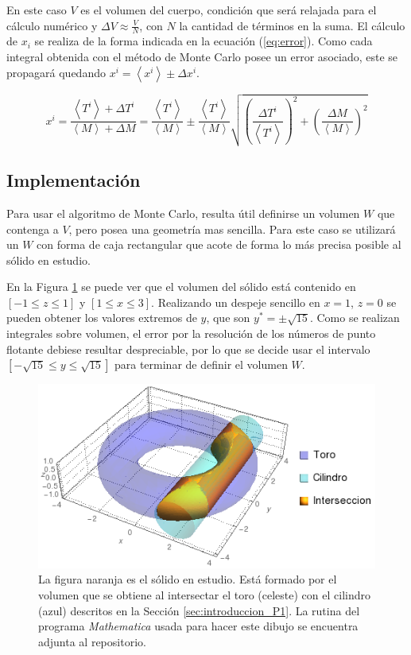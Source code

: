 \documentclass{article}
\def\mean#1{\left< #1 \right>}
\begin{document}
En este caso $V$ es el volumen del cuerpo, condición que será relajada para el cálculo numérico y $\Delta V \approx \frac{V}{N}$, con $N$ la cantidad de términos en la suma. El cálculo de $x_i$ se realiza de la forma indicada en la ecuación (\ref{eq:error}). Como cada integral obtenida con el método de Monte Carlo posee un error asociado, este se propagará quedando $x^i = \mean{x^i} \pm \Delta x^i$.

\begin{equation}
  x^i = \frac{\mean{T^i} + \Delta T^i}{\mean{M} + \Delta M} = \frac{\mean{T^i}}{\mean{M}} \pm \frac{\mean{T^i}}{\mean{M}} \sqrt{ \left( \frac{\Delta T^i}{\mean{T^i}} \right)^2 + \left( \frac{\Delta M}{\mean{M}} \right)^2 }
  \label{eq:error}
\end{equation}

\subsection{Implementación}

Para usar el algoritmo de Monte Carlo, resulta útil definirse un volumen $W$ que contenga a $V$, pero posea una geometría mas sencilla. Para este caso se utilizará un $W$ con forma de caja rectangular que acote de forma lo más precisa posible al sólido en estudio.

En la Figura \ref{fig:interseccion_P1} se puede ver que el volumen del sólido está contenido en $ [-1 \le z \le 1]$ y $[1 \le x \le 3]$. Realizando un despeje sencillo en $x = 1$, $z = 0$ se pueden obtener los valores extremos de $y$, que son $y^* = \pm \sqrt{15}$. Como se realizan integrales sobre volumen, el error por la resolución de los números de punto flotante debiese resultar despreciable, por lo que se decide usar el intervalo $[-\sqrt{15} \le y \le \sqrt{15} ]$ para terminar de definir el volumen $W$.

\begin{figure}[ht]
  \centering
  \includegraphics[scale = 0.5]{images/interseccion_P1.png}
  \caption{La figura naranja es el sólido en estudio. Está formado por el volumen que se obtiene al intersectar el toro (celeste) con el cilindro (azul) descritos en la Sección \ref{sec:introduccion_P1}. La rutina del programa \emph{Mathematica} usada para hacer este dibujo se encuentra adjunta al repositorio.}
  \label{fig:interseccion_P1}
\end{figure}
\end{document}
